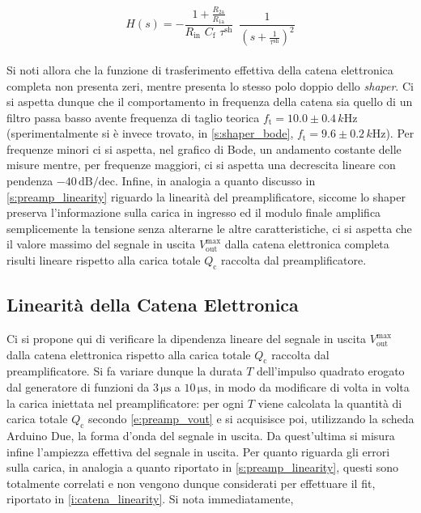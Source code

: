 \documentclass[a4paper,11pt]{article} %
\begin{document}
\begin{equation}\label{e:catena_H_final} 
	H(s) = -\frac{ 1 + \frac{R_{2\text{a}}}{R_{1\text{a}}} }{ R_{\text{in}}
	\,\, C_{\text{f}} \,\, \tau^{ \text{sh} } } 
	\,\,\, \frac{1}{\left( s + \frac{ 1 }{ \tau^{ \text{sh} } } \right)^2}
\end{equation}\\
Si noti allora che la funzione di trasferimento effettiva della catena elettronica completa non presenta zeri, mentre
presenta lo stesso polo doppio dello \textit{shaper}. Ci si aspetta dunque che il comportamento in frequenza della
catena sia quello di un filtro passa basso avente frequenza di taglio teorica $f_{\text{t}} = 10.0 \pm 0.4 \,\si{k\Hz}$
(sperimentalmente si è invece trovato, in \autoref{s:shaper_bode}, $f_{\text{t}} = 9.6 \pm 0.2 \,\si{k\Hz}$). Per
frequenze minori ci si aspetta, nel grafico di Bode, un andamento costante delle misure mentre, per frequenze maggiori,
ci si aspetta una decrescita lineare con pendenza $-40\,\text{dB/dec}$. Infine, in analogia a quanto discusso in
\autoref{s:preamp_linearity} riguardo la linearità del preamplificatore, siccome lo shaper preserva l'informazione sulla
carica in ingresso ed il modulo finale amplifica semplicemente la tensione senza alterarne le altre caratteristiche, ci
si aspetta che il valore massimo del segnale in uscita $V_{\text{out}}^{\text{max}}$ dalla catena elettronica completa
risulti lineare rispetto alla carica totale $Q_{\text{c}}$ raccolta dal preamplificatore.


\subsection{Linearità della Catena Elettronica}\label{s:catena_linearity}

Ci si propone qui di verificare la dipendenza lineare del segnale in uscita $V_{\text{out}}^{\text{max}}$ dalla catena
elettronica rispetto alla carica totale $Q_{\text{c}}$ raccolta dal preamplificatore. Si fa variare dunque la durata $T$
dell'impulso quadrato erogato dal generatore di funzioni da $3\,\si{\us}$ a $10\,\si{\us}$, in modo da modificare di
volta in volta la carica iniettata nel preamplificatore: per ogni $T$ viene calcolata la quantità di carica totale
$Q_{\text{c}}$ secondo \autoref{e:preamp_vout} e si acquisisce poi, utilizzando la scheda Arduino Due, la forma d'onda
del segnale in uscita. Da quest'ultima si misura infine l'ampiezza effettiva del segnale in uscita. Per quanto riguarda
gli errori sulla carica, in analogia a quanto riportato in \autoref{s:preamp_linearity}, questi sono totalmente
correlati e non vengono dunque considerati per effettuare il fit, riportato in \autoref{i:catena_linearity}. Si nota
immediatamente,
\end{document}
